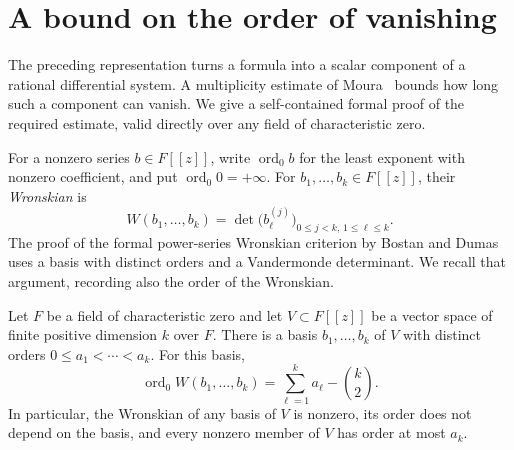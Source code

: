 \section{A bound on the order of vanishing}
\label{sec:multiplicity}

The preceding representation turns a formula into a scalar component of a
rational differential system. A multiplicity estimate of
Moura~\cite{Moura2003} bounds how long such a component can vanish.
We give a self-contained formal proof of the required estimate,
valid directly over any field of characteristic zero.

For a nonzero series $b\in F[[z]]$, write $\operatorname{ord}_0 b$ for the
least exponent with nonzero coefficient, and put
$\operatorname{ord}_0 0=+\infty$.  For $b_1,\ldots,b_k\in F[[z]]$,
their \emph{Wronskian} is
\[
 W(b_1,\ldots,b_k)
 =\det\bigl(b_\ell^{(j)}\bigr)_{
       0\le j<k,\,1\le\ell\le k}.
\]
The proof of the formal power-series Wronskian criterion by
Bostan and Dumas~\cite[Theorem~2 and Lemmas~1--3]{BostanDumas2010}
uses a basis with distinct orders and a Vandermonde determinant.
We recall that argument, recording also the order of the Wronskian.

\begin{lemma}\label{lem:wronskian}
Let $F$ be a field of characteristic zero and let $V\subset F[[z]]$ be a
vector space of finite positive dimension $k$ over $F$.  There is a basis
$b_1,\ldots,b_k$ of $V$ with distinct orders
$0\le a_1<\cdots<a_k$.  For this basis,
\begin{equation}\label{eq:wronskian-order}
 \operatorname{ord}_0 W(b_1,\ldots,b_k)
 =\sum_{\ell=1}^k a_\ell-\binom{k}{2}.
\end{equation}
In particular, the Wronskian of any basis of $V$ is nonzero, its order
does not depend on the basis, and every nonzero member of $V$ has order
at most $a_k$.
\end{lemma}

